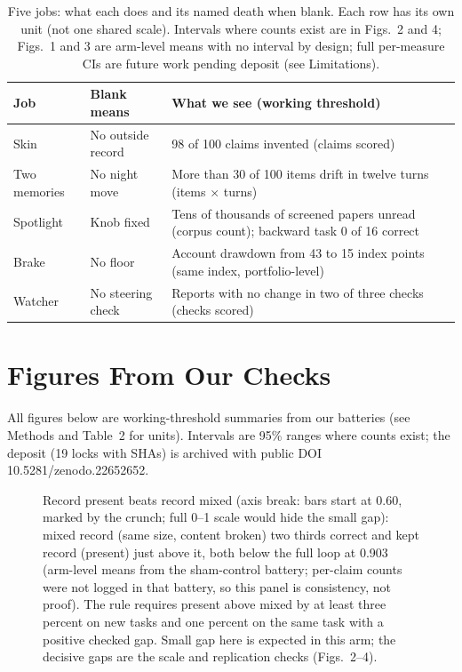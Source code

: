 \documentclass[11pt,a4paper]{article}
\begin{document}
\begin{table}[h]
\centering
\caption{Five jobs: what each does and its named death when blank. Each row has its own unit (not one shared scale). Intervals where counts exist are in Figs.~2 and 4; Figs.~1 and 3 are arm-level means with no interval by design; full per-measure CIs are future work pending deposit (see Limitations).}
\begin{tabular}{p{2.2cm}p{4.2cm}p{6.5cm}}
\toprule
Job & Blank means & What we see (working threshold) \\
\midrule
Skin & No outside record & 98 of 100 claims invented (claims scored) \\
Two memories & No night move & More than 30 of 100 items drift in twelve turns (items $\times$ turns) \\
Spotlight & Knob fixed & Tens of thousands of screened papers unread (corpus count); backward task 0 of 16 correct \\
Brake & No floor & Account drawdown from 43 to 15 index points (same index, portfolio-level) \\
Watcher & No steering check & Reports with no change in two of three checks (checks scored) \\
\bottomrule
\end{tabular}
\end{table}

\section{Figures From Our Checks}
All figures below are working-threshold summaries from our batteries (see Methods and Table~2 for units). Intervals are 95\% ranges where counts exist; the deposit (19 locks with SHAs) is archived with public DOI 10.5281/zenodo.22652652.

\begin{figure}[h]
\centering
{}
\caption{Record present beats record mixed (axis break: bars start at 0.60, marked by the crunch; full 0--1 scale would hide the small gap): mixed record (same size, content broken) two thirds correct and kept record (present) just above it, both below the full loop at 0.903 (arm-level means from the sham-control battery; per-claim counts were not logged in that battery, so this panel is consistency, not proof). The rule requires present above mixed by at least three percent on new tasks and one percent on the same task with a positive checked gap. Small gap here is expected in this arm; the decisive gaps are the scale and replication checks (Figs.~2--4).}
\end{figure}
\end{document}
